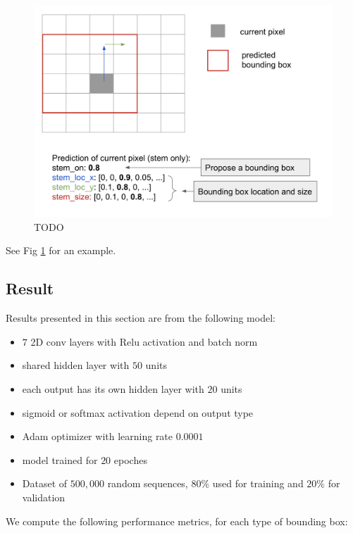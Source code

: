 \documentclass[12pt]{article}
\begin{document}
\begin{figure}[h]
    \centering
    \includegraphics[width=\textwidth]{plot/inference_bb_prediction.png}
    \caption{TODO}
    \label{fig:inference_bb_prediction}
    \centering
\end{figure}


See Fig \ref{fig:inference_bb_prediction} for an example.


\subsection{Result}

Results presented in this section are from the following model:

\begin{itemize}
    \item $7$ 2D conv layers with Relu activation and batch norm
    \item shared hidden layer with $50$ units
    \item each output has its own hidden layer with $20$ units
    \item sigmoid or softmax activation depend on output type
    \item Adam optimizer with learning rate $0.0001$
    \item model trained for $20$ epoches
    \item Dataset of $500,000$ random sequences, $80\%$ used for training and $20\%$ for validation
\end{itemize}

We compute the following performance metrics, for each type of bounding box:
\end{document}
